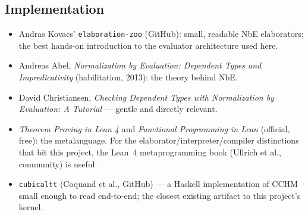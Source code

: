 \documentclass[11pt]{article}
\begin{document}
\subsection{Implementation}
\begin{itemize}[leftmargin=1.5em]
\item Andras Kovacs' \texttt{elaboration-zoo} (GitHub): small,
readable NbE elaborators; the best hands-on introduction to the
evaluator architecture used here.
\item Andreas Abel, \emph{Normalization by Evaluation: Dependent Types
and Impredicativity} (habilitation, 2013): the theory behind NbE.
\item David Christiansen, \emph{Checking Dependent Types with
Normalization by Evaluation: A Tutorial} --- gentle and directly relevant.
\item \emph{Theorem Proving in Lean 4} and \emph{Functional Programming
in Lean} (official, free): the metalanguage.  For the
elaborator/interpreter/compiler distinctions that bit this project, the
Lean~4 metaprogramming book (Ullrich et al., community) is useful.
\item \texttt{cubicaltt} (Coquand et al., GitHub) --- a Haskell
implementation of CCHM small enough to read end-to-end; the closest
existing artifact to this project's kernel.
\end{itemize}
\end{document}
